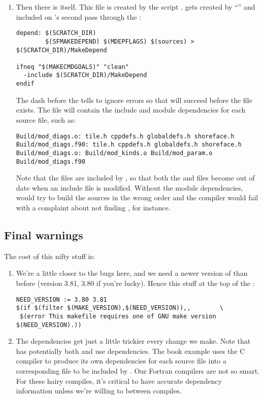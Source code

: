 \begin{enumerate}
\item Then there is  itself. This file is created
by the  script . 
gets created by ``'' and included on 's
second pass through the :
\begin{verbatim}
depend: $(SCRATCH_DIR)
        $(SFMAKEDEPEND) $(MDEPFLAGS) $(sources) > $(SCRATCH_DIR)/MakeDepend 

ifneq "$(MAKECMDGOALS)" "clean"
  -include $(SCRATCH_DIR)/MakeDepend
endif
\end{verbatim}
The dash before the  tells  to ignore
errors so that  will succeed before the file
exists. The  file will contain the include and
module dependencies for each source file, such as:
\begin{verbatim}
Build/mod_diags.o: tile.h cppdefs.h globaldefs.h shoreface.h
Build/mod_diags.f90: tile.h cppdefs.h globaldefs.h shoreface.h
Build/mod_diags.o: Build/mod_kinds.o Build/mod_param.o Build/mod_diags.f90
\end{verbatim}
Note that the  files are included by , so that
both the  and  files become out of date when an
include file is modified. Without the module dependencies,
 would try to build the sources in the wrong order and
the compiler would fail with a complaint about not finding
, for instance.
\end{enumerate}

\subsection{Final warnings}

The cost of this nifty  stuff is:
\begin{enumerate}
\item We're a little closer to the  bugs here, and we
need a newer version of  than before (version 3.81,
3.80 if you're lucky).
Hence this stuff at the top of the :
\begin{verbatim}
NEED_VERSION := 3.80 3.81
$(if $(filter $(MAKE_VERSION),$(NEED_VERSION)),,        \
 $(error This makefile requires one of GNU make version $(NEED_VERSION).))
\end{verbatim}

\item The  dependencies get just a little trickier every
change we make. Note that \code{F90} has potentially both \code{include}
and \code{module} use dependencies. The book example uses the C compiler
to produce its own dependencies for each source file into a corresponding
\code{.d} file to be included by \code{make}. Our Fortran compilers are
not so smart. For these hairy compiles, it's critical to have accurate
dependency information unless we're willing to \code{make clean} between
compiles.
\end{enumerate}
